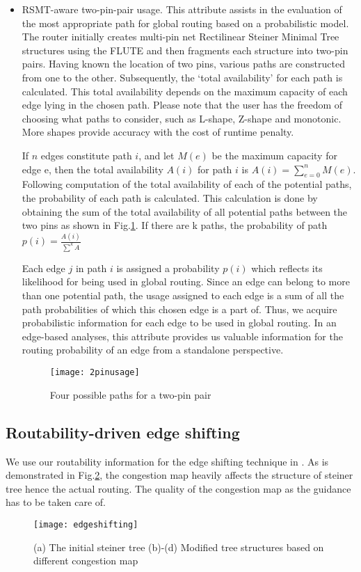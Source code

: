 \begin{itemize}
\item RSMT-aware two-pin-pair usage. This attribute assists in the evaluation of the most appropriate path for global routing based on a probabilistic model. The router initially creates multi-pin net Rectilinear Steiner Minimal Tree structures using the FLUTE \cite{FLUTE} and then fragments each structure into two-pin pairs. Having known the location of two pins, various paths are constructed from one to the other. Subsequently, the ‘total availability’ for each path is calculated. This total availability depends on the maximum capacity of each edge lying in the chosen path. Please note that the user has the freedom of choosing what paths to consider, such as L-shape, Z-shape and monotonic. More shapes provide accuracy with the cost of runtime penalty.

If $n$ edges constitute path $i$, and let $M(e)$ be the maximum capacity for edge e, then the total availability $A(i)$ for path $i$ is $A(i)=\sum_{e=0}^{n}M(e)$. Following computation of the total availability of each of the potential paths, the probability of each path is calculated. This calculation is done by obtaining the sum of the total availability of all potential paths between the two pins as shown in Fig.\ref{fig:2pinusage}. If there are k paths, the probability of path $p(i)=\frac{A(i)}{\sum^{k}A}$

Each edge $j$ in path $i$ is assigned a probability $p(i)$ which reflects its likelihood for being used in global routing. Since an edge can belong to more than one potential path, the usage assigned to each edge is a sum of all the path probabilities of which this chosen edge is a part of. Thus, we acquire probabilistic information for each edge to be used in global routing. In an edge-based analyses, this attribute provides us valuable information for the routing probability of an edge from a standalone perspective.
\begin{figure}[htbp]
	\centerline{\texttt{[image: 2pinusage]}}
	\caption{Four possible paths for a two-pin pair}
	\label{fig:2pinusage}
\end{figure}
\end{itemize}

\subsection{Routability-driven edge shifting}
We use our routability information for the edge shifting technique in \cite{fastroute}. As is demonstrated in Fig.\ref{fig:edgeshifting}, the congestion map heavily affects the structure of steiner tree hence the actual routing. The quality of the congestion map as the guidance has to be taken care of.
\begin{figure}[htbp]
	\centerline{\texttt{[image: edgeshifting]}}
	\caption{(a) The initial steiner tree (b)-(d) Modified tree structures based on different congestion map}
	\label{fig:edgeshifting}
\end{figure}


